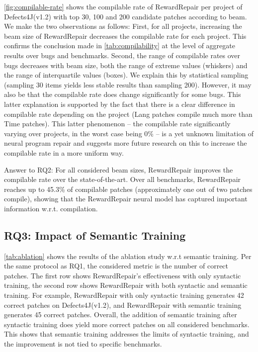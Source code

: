\autoref{fig:compilable-rate} shows the compilable rate of RewardRepair per project of Defects4J(v1.2) with top 30, 100 and 200 candidate patches according to beam. 
We make the two observations as follows:
First, for all  projects, increasing the beam size of RewardRepair decreases the compilable rate for each project. This confirms the conclusion made in \autoref{tab:compilability} at the level of aggregate results over bugs and benchmarks.
Second, the range of compilable rates over bugs decreases with beam size, both the range of extreme values (whiskers) and the range of interquartile values (boxes). 
We explain this by statistical sampling (sampling 30 items yields less stable results than sampling 200). However, it may also be that the compilable rate does change significantly for some bugs. 
This latter explanation is supported by the fact that there is a clear difference in compilable rate depending on the project (Lang patches compile much more than Time patches). 
This latter phenomenon -- the compilable rate significantly varying over projects, in the worst case being 0\% -- is a yet unknown limitation of neural program repair and 
suggests more future research on this to increase the compilable rate in a more uniform way.

\begin{mdframed}
Answer to RQ2: 
For all considered beam sizes, RewardRepair improves the compilable rate over the state-of-the-art.
Over all benchmarks, RewardRepair reaches up to 45.3\% of compilable patches (approximately one out of two patches compile), showing that the RewardRepair neural model has captured important information w.r.t. compilation.
\end{mdframed}

\subsection{RQ3: Impact of Semantic Training}

\autoref{tab:ablation} shows the results of the ablation study w.r.t semantic training. 
Per the same protocol as RQ1, the considered metric is the number of correct patches.
The first row shows RewardRepair's effectiveness with only syntactic training, the second row shows  RewardRepair with both syntactic and semantic training. 
For example, RewardRepair with only
syntactic training generates 42 correct patches on Defects4J(v1.2),
and RewardRepair with semantic training generates 45 correct
patches.
Overall, the addition of semantic training after syntactic training does yield more correct patches on  all considered benchmarks. This  shows that semantic training addresses the limits of syntactic training, and the improvement is not tied to specific benchmarks.

